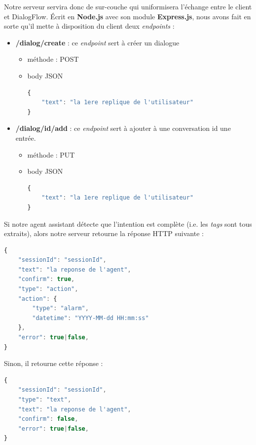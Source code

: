Notre serveur servira donc de \og sur-couche \fg{} qui uniformisera l'échange entre le client et DialogFlow. Écrit en \textbf{Node.js} avec son module \textbf{Express.js}, nous avons fait en sorte qu'il mette à disposition du client deux \emph{endpoints} :\\
\begin{itemize}
    \item \textbf{/dialog/create} : ce \emph{endpoint} sert à créer un dialogue
    \begin{itemize}
        \item méthode : POST
        \item body JSON
        \begin{lstlisting}[language=Javascript]
{
    "text": "la 1ere replique de l'utilisateur"
}
        \end{lstlisting}
    \end{itemize}
    \item \textbf{/dialog/{id}/add} : ce \emph{endpoint} sert à ajouter à une conversation \og id \fg{} une entrée.
    \begin{itemize}
        \item méthode : PUT
        \item body JSON
        \begin{lstlisting}[language=Javascript]
{
    "text": "la 1ere replique de l'utilisateur"
}
        \end{lstlisting}
    \end{itemize}
\end{itemize}


Si notre agent assistant détecte que l'intention est complète (i.e. les \emph{tags} sont tous extraits), alors notre serveur retourne la réponse HTTP suivante :\\

\begin{lstlisting}[language=Javascript]
{
    "sessionId": "sessionId",
    "text": "la reponse de l'agent",
    "confirm": true,
    "type": "action",
    "action": {
        "type": "alarm",
        "datetime": "YYYY-MM-dd HH:mm:ss"
    },
    "error": true|false,
}
\end{lstlisting}

Sinon, il retourne cette réponse : \\

\begin{lstlisting}[language=Javascript]
{
    "sessionId": "sessionId",
    "type": "text",
    "text": "la reponse de l'agent",
    "confirm": false,
    "error": true|false,
}
\end{lstlisting}

